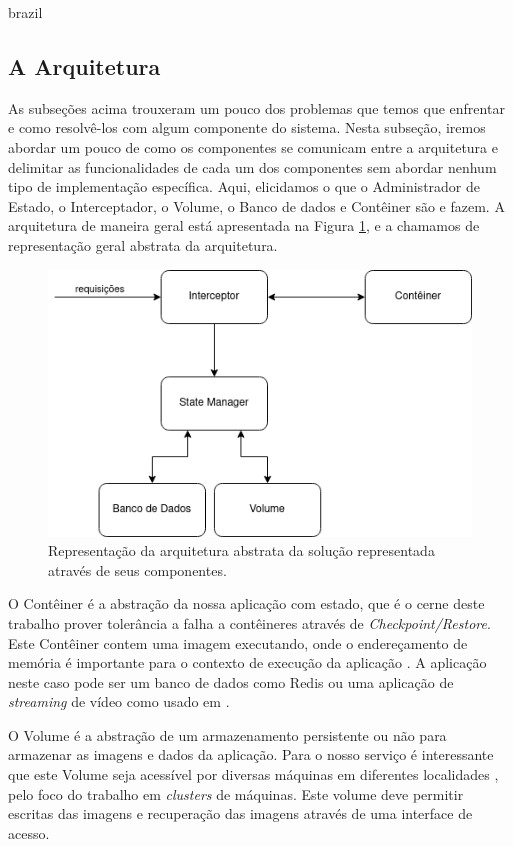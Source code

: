 \begin{otherlanguage*}{brazil}
\subsection{A Arquitetura}

As subseções acima trouxeram um pouco dos problemas que temos que enfrentar e como
resolvê-los com algum componente do sistema. Nesta subseção, iremos
abordar um pouco de como os componentes se comunicam entre a arquitetura e delimitar as
funcionalidades de cada um dos componentes sem abordar nenhum tipo de implementação
específica. Aqui, elicidamos o que o Administrador de Estado, o Interceptador, o Volume, o
Banco de dados e Contêiner são e fazem. A arquitetura de maneira geral está apresentada na Figura
\ref{fig:abstract-architecture}, e a chamamos de representação geral abstrata da arquitetura.

\begin{figure}[h]
\centering
\includegraphics[scale=0.54]{images/abstract-architecture.png}
\caption{Representação da arquitetura abstrata da solução representada através de seus componentes.}
\label{fig:abstract-architecture}
\end{figure}

O Contêiner é a abstração da nossa aplicação com estado, que é o cerne deste trabalho
prover tolerância a falha a contêineres através de \textit{Checkpoint/Restore}. Este Contêiner
contem uma imagem executando, onde o endereçamento de memória é importante para o contexto
de execução da aplicação \cite{Chen2015/10}. A aplicação neste caso pode ser um banco
de dados como Redis ou uma aplicação de \textit{streaming} de vídeo como usado em \cite{vayghan2021kubernetes}.

O Volume é a abstração de um armazenamento persistente ou não para armazenar as imagens e
dados da aplicação. Para o nosso serviço é interessante que este Volume seja acessível
por diversas máquinas em diferentes localidades \cite{vayghan2021kubernetes}, pelo foco
do trabalho em \textit{clusters} de máquinas. Este volume deve permitir escritas das imagens
e recuperação das imagens através de uma interface de acesso.


\end{otherlanguage*}

